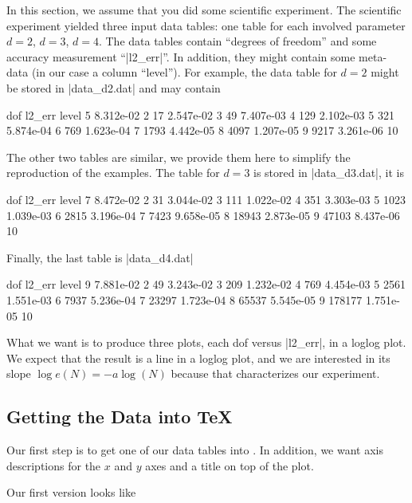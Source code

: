 
In this section, we assume that you did some scientific experiment. The scientific experiment yielded three input data tables: one table for each involved parameter $d=2$, $d=3$, $d=4$. The data tables contain ``degrees of freedom'' and some accuracy measurement ``|l2_err|''. In addition, they might contain some meta-data (in our case a column ``level''). For example, the data table for $d=2$ might be stored in |data_d2.dat| and may contain
\begin{codeexample}
dof        l2_err     level
5          8.312e-02  2
17         2.547e-02  3
49         7.407e-03  4
129        2.102e-03  5
321        5.874e-04  6
769        1.623e-04  7
1793       4.442e-05  8
4097       1.207e-05  9
9217       3.261e-06  10
\end{codeexample}
The other two tables are similar, we provide them here to simplify the reproduction of the examples. The table for $d=3$ is stored in |data_d3.dat|, it is
\begin{codeexample}
dof        l2_err     level
7          8.472e-02  2
31         3.044e-02  3
111        1.022e-02  4
351        3.303e-03  5
1023       1.039e-03  6
2815       3.196e-04  7
7423       9.658e-05  8
18943      2.873e-05  9
47103      8.437e-06  10
\end{codeexample}
Finally, the last table is |data_d4.dat|
\begin{codeexample}
dof        l2_err     level
9          7.881e-02  2
49         3.243e-02  3
209        1.232e-02  4
769        4.454e-03  5
2561       1.551e-03  6
7937       5.236e-04  7
23297      1.723e-04  8
65537      5.545e-05  9
178177     1.751e-05  10
\end{codeexample}

What we want is to produce three plots, each dof versus |l2_err|, in a loglog plot. We expect that the result is a line in a loglog plot, and we are interested in its slope $\log e(N) = -a \log(N)$ because that characterizes our experiment.

\subsection{Getting the Data into TeX}
\label{sec:tut2:step1}

Our first step is to get one of our data tables into \PGFPlots. In addition, we want axis descriptions for the $x$ and $y$ axes and a title on top of the plot.

Our first version looks like
\begin{codeexample}[]

%


%
\end{codeexample}

